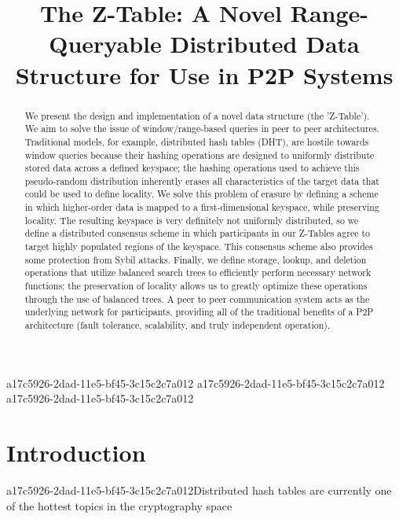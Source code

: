 \documentclass[12pt]{article}
\title{The Z-Table: A Novel Range-Queryable Distributed Data Structure for Use in P2P Systems}
\begin{document}
\maketitle

\begin{abstract}
We present the design and implementation of a novel data structure (the 'Z-Table'). We aim to solve the issue of window/range-based queries in peer to peer architectures. Traditional models, for example,  distributed hash tables (DHT), are hostile towards window queries because their hashing operations are designed to uniformly distribute stored data across a defined keyspace; the hashing operations used to achieve this pseudo-random distribution inherently erases all characteristics of the target data that could be used to define locality. We solve this problem of erasure by defining a scheme in which higher-order data is mapped to a first-dimensional keyspace, while preserving locality. The resulting keyspace is very definitely not uniformly distributed, so we define a distributed consensus scheme in which participants in our Z-Tables agree to target highly populated regions of the keyspace. This consensus scheme also provides some protection from Sybil attacks. Finally, we define storage, lookup, and deletion operations that utilize balanced search trees to efficiently perform necessary network functions; the preservation of locality allows us to greatly optimize these operations through the use of balanced trees. A peer to peer communication system acts as the underlying network for participants, providing all of the traditional benefits of a P2P architecture (fault tolerance, scalability, and truly independent operation).
\end{abstract}
a17c5926-2dad-11e5-bf45-3c15c2c7a012
a17c5926-2dad-11e5-bf45-3c15c2c7a012
a17c5926-2dad-11e5-bf45-3c15c2c7a012\newpage
\section{Introduction}
a17c5926-2dad-11e5-bf45-3c15c2c7a012Distributed hash tables are currently one of the hottest topics in the cryptography space~\cite{Stoica:2001dj,Rowstron:2001ea,Ratnasamy:2001wn}

\printbibliography
\end{document}

